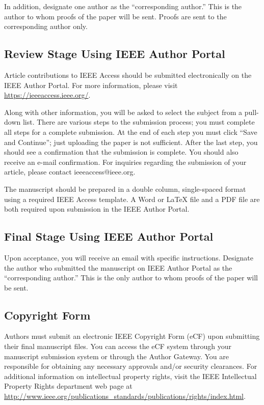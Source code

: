 \documentclass{ieeeaccess}
\begin{document}
In addition, designate one author as the ``corresponding author.'' This is the author to whom proofs of the paper will be sent. Proofs are sent to the corresponding author only.

\subsection{Review Stage Using IEEE Author Portal}
Article contributions to IEEE Access should be submitted electronically on the IEEE Author Portal. For more information, please visit \underline{https://ieeeaccess.ieee.org/}.

Along with other information, you will be asked to select the subject from a pull-down list. There are various steps to the submission process; you must complete all steps for a complete submission. At the end of each step you must click ``Save and Continue''; just uploading the paper is not sufficient. After the last step, you should see a confirmation that the submission is complete. You should also receive an e-mail confirmation. For inquiries regarding the submission of your article, please contact ieeeaccess@ieee.org.

The manuscript should be prepared in a double column, single-spaced format using a required IEEE Access template. A Word or LaTeX file and a PDF file are both required upon submission in the IEEE Author Portal.

\subsection{Final Stage Using IEEE Author Portal}
Upon acceptance, you will receive an email with specific instructions. Designate the author who submitted the manuscript on IEEE Author Portal as the ``corresponding author.'' This is the only author to whom proofs of the paper will be sent.

\subsection{Copyright Form}
Authors must submit an electronic IEEE Copyright Form (eCF) upon submitting their final manuscript files. You can access the eCF system through your manuscript submission system or through the Author Gateway. You are responsible for obtaining any necessary approvals and/or security clearances. For additional information on intellectual property rights, visit the IEEE Intellectual Property Rights department web page at \underline{http://www.ieee.org/publications\_standards/publications/rights/index.html}.
\end{document}
